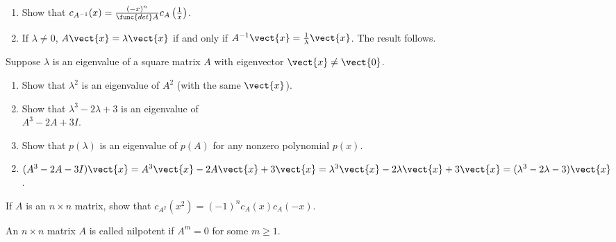 \begin{multicols}{2}
\begin{ex}
\begin{enumerate}[label={\alph*.}]
\item Show that $c_{A^{-1}}(x) = \frac{(-x)^n}{\func{det } A} c_A \left( \frac{1}{x} \right)$.


\end{enumerate}
\begin{sol}
\begin{enumerate}[label={\alph*.}]
\setcounter{enumi}{1}
\item  If $\lambda \neq 0$, $A\vect{x} = \lambda\vect{x}$ if and only if $A^{-1}\vect{x} = \frac{1}{\lambda}\vect{x}$.
 The result follows.

\end{enumerate}
\end{sol}
\end{ex}

\begin{ex}
Suppose $\lambda$ is an eigenvalue of a square matrix $A$ with eigenvector $\vect{x} \neq \vect{0}$.


\begin{enumerate}[label={\alph*.}]
\item Show that $\lambda^{2}$ is an eigenvalue of $A^{2}$ (with the same $\vect{x}$).

\item Show that $\lambda^{3} - 2 \lambda + 3$ is an eigenvalue of \\ $A^{3} - 2A + 3I$.

\item Show that $p(\lambda)$ is an eigenvalue of $p(A)$ for any nonzero polynomial $p(x)$.

\end{enumerate}
\begin{sol}
\begin{enumerate}[label={\alph*.}]
\setcounter{enumi}{1}
\item  $(A^{3} - 2A - 3I)\vect{x} = A^{3}\vect{x} - 2A\vect{x} + 3\vect{x} = \lambda^{3}\vect{x} - 2\lambda\vect{x} + 3\vect{x} = (\lambda^{3} - 2\lambda - 3)\vect{x}$.

\end{enumerate}
\end{sol}
\end{ex}

\begin{ex}
If $A$ is an $n \times n$ matrix, show that $c_{A^2}(x^{2}) = (-1)^{n}c_{A}(x)c_{A}(-x)$.
\end{ex}

\begin{ex}
An $n \times n$ matrix $A$ is called nilpotent if $A^{m} = 0$ for some $m \geq 1$.



\end{ex}
\end{multicols}
